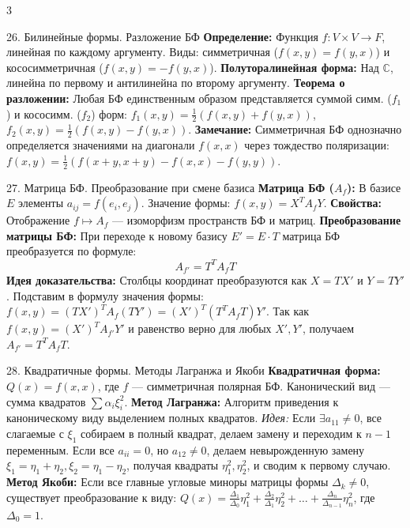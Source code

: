 \documentclass[8pt, a4paper, landscape]{extarticle}
\begin{document}
\begin{multicols*}{3}
\begin{ticket}{26. Билинейные формы. Разложение БФ}
\textbf{Определение:} Функция $f: V \times V \to F$, линейная по каждому аргументу. 
Виды: симметричная ($f(x,y)=f(y,x)$) и кососимметричная ($f(x,y)=-f(y,x)$).
\textbf{Полуторалинейная форма:} Над $\mathbb{C}$, линейна по первому и антилинейна по второму аргументу.
\tcblower
\textbf{Теорема о разложении:} Любая БФ единственным образом представляется суммой симм. ($f_1$) и кососимм. ($f_2$) форм:
$f_1(x,y) = \frac{1}{2}(f(x,y)+f(y,x))$, $f_2(x,y) = \frac{1}{2}(f(x,y)-f(y,x))$.
\textbf{Замечание:} Симметричная БФ однозначно определяется значениями на диагонали $f(x,x)$ через тождество поляризации: 
$f(x,y) = \frac{1}{2}(f(x+y,x+y) - f(x,x) - f(y,y))$.
\end{ticket}

\begin{ticket}{27. Матрица БФ. Преобразование при смене базиса}
\textbf{Матрица БФ ($A_f$):} В базисе $E$ элементы $a_{ij} = f(e_i, e_j)$. 
Значение формы: $f(x, y) = X^T A_f Y$.
\textbf{Свойства:} Отображение $f \mapsto A_f$ --- изоморфизм пространств БФ и матриц.
\tcblower
\textbf{Преобразование матрицы БФ:} При переходе к новому базису $E' = E \cdot T$ матрица БФ преобразуется по формуле:
\[A_{f'} = T^T A_f T\]
\textbf{Идея доказательства:} Столбцы координат преобразуются как $X = T X'$ и $Y = T Y'$. 
Подставим в формулу значения формы: 
$f(x, y) = (T X')^T A_f (T Y') = (X')^T (T^T A_f T) Y'$.
Так как $f(x, y) = (X')^T A_{f'} Y'$ и равенство верно для любых $X', Y'$, получаем $A_{f'} = T^T A_f T$.
\end{ticket}

\begin{ticket}{28. Квадратичные формы. Методы Лагранжа и Якоби}
\textbf{Квадратичная форма:} $Q(x) = f(x,x)$, где $f$ --- симметричная полярная БФ. Канонический вид --- сумма квадратов $\sum \alpha_i \xi_i^2$.
\textbf{Метод Лагранжа:} Алгоритм приведения к каноническому виду выделением полных квадратов.
\textit{Идея:} Если $\exists a_{11} \neq 0$, все слагаемые с $\xi_1$ собираем в полный квадрат, делаем замену и переходим к $n-1$ переменным. Если все $a_{ii}=0$, но $a_{12} \neq 0$, делаем невырожденную замену $\xi_1 = \eta_1+\eta_2, \xi_2 = \eta_1-\eta_2$, получая квадраты $\eta_1^2, \eta_2^2$, и сводим к первому случаю.
\tcblower
\textbf{Метод Якоби:} Если все главные угловые миноры матрицы формы $\Delta_k \neq 0$, существует преобразование к виду:
$Q(x) = \frac{\Delta_1}{\Delta_0} \eta_1^2 + \frac{\Delta_2}{\Delta_1} \eta_2^2 + \dots + \frac{\Delta_n}{\Delta_{n-1}} \eta_n^2$, где $\Delta_0 = 1$.
\end{ticket}


\end{multicols*}
\end{document}
